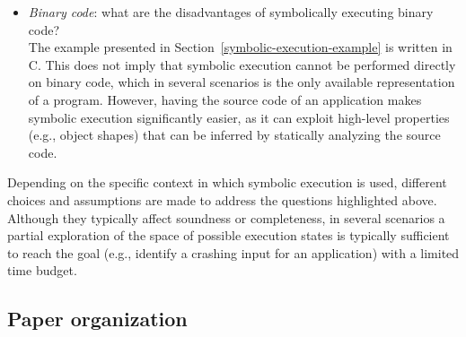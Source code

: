\begin{itemize}
  \item {\em Binary code}: what are the disadvantages of symbolically executing binary code? \\
  The example presented in Section~\ref{symbolic-execution-example} is written in C. This does not imply that symbolic execution cannot be performed directly on binary code, which in several scenarios is the only available representation of a program. However, having the source code of an application makes symbolic execution significantly easier, as it can exploit high-level properties (e.g., object shapes) that can be inferred by statically analyzing the source code.
   
\end{itemize}
Depending on the specific context in which symbolic execution is used, different choices and assumptions are made to address the questions highlighted above. Although they typically affect soundness or completeness, in several scenarios a partial exploration of the space of possible execution states is typically sufficient to reach the goal (e.g., identify a crashing input for an application) with a limited time budget.


\subsection{Paper organization}

